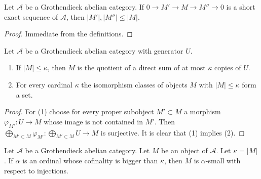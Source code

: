 \begin{lemma}
\label{lemma-size-goes-down}
Let $\mathcal{A}$ be a Grothendieck abelian category.
If $0 \to M' \to M \to M'' \to 0$ is a short exact sequence of
$\mathcal{A}$, then $|M'|, |M''| \leq |M|$.
\end{lemma}

\begin{proof}
Immediate from the definitions.
\end{proof}

\begin{lemma}
\label{lemma-set-iso-classes-bounded-size}
Let $\mathcal{A}$ be a Grothendieck abelian category with generator $U$.
\begin{enumerate}
\item If $|M| \leq \kappa$, then $M$ is the quotient of a direct
sum of at most $\kappa$ copies of $U$.
\item For every cardinal $\kappa$ the isomorphism classes
of objects $M$ with $|M| \leq \kappa$ form a set.
\end{enumerate}
\end{lemma}

\begin{proof}
For (1) choose for every proper subobject $M' \subset M$ a morphism
$\varphi_{M'} : U \to M$ whose image is not contained in $M'$. Then
$\bigoplus_{M' \subset M} \varphi_{M'} : \bigoplus_{M' \subset M} U \to M$
is surjective. It is clear that (1) implies (2).
\end{proof}

\begin{proposition}
\label{proposition-objects-are-small}
Let $\mathcal{A}$ be a Grothendieck abelian category. Let $M$ be an
object of $\mathcal{A}$. Let $\kappa = |M|$.
If $\alpha$ is an ordinal whose cofinality is bigger than $\kappa$,
then $M$ is $\alpha$-small with respect to injections.
\end{proposition}

